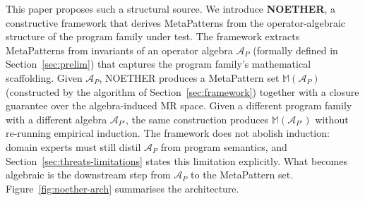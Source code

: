 \documentclass[manuscript]{acmart}
\begin{document}
This paper proposes such a structural source. We introduce \textbf{NOETHER}, a constructive framework that derives MetaPatterns from the operator-algebraic structure of the program family under test. The framework extracts MetaPatterns from invariants of an operator algebra $\mathcal{A}_P$ (formally defined in Section~\ref{sec:prelim}) that captures the program family's mathematical scaffolding. Given $\mathcal{A}_P$, NOETHER produces a MetaPattern set $\mathbb{M}(\mathcal{A}_P)$ (constructed by the algorithm of Section~\ref{sec:framework}) together with a closure guarantee over the algebra-induced MR space. Given a different program family with a different algebra $\mathcal{A}_{P'}$, the same construction produces $\mathbb{M}(\mathcal{A}_{P'})$ without re-running empirical induction. The framework does not abolish induction: domain experts must still distil $\mathcal{A}_P$ from program semantics, and Section~\ref{sec:threats-limitations} states this limitation explicitly. What becomes algebraic is the downstream step from $\mathcal{A}_P$ to the MetaPattern set. Figure~\ref{fig:noether-arch} summarises the architecture.
\end{document}
